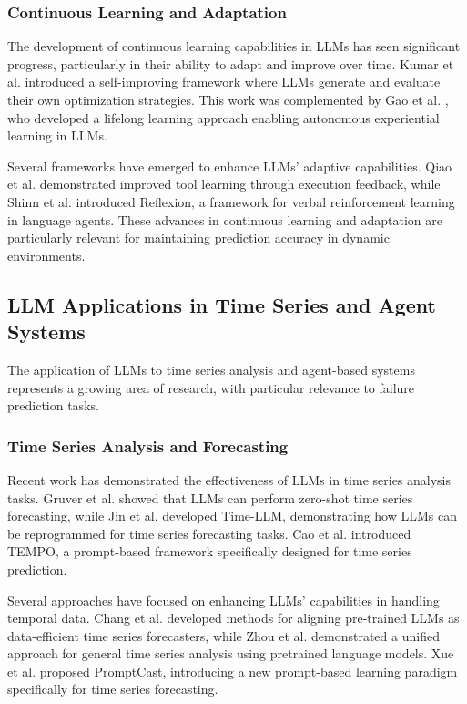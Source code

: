 \documentclass[conference]{IEEEtran}
\begin{document}
\subsubsection{Continuous Learning and Adaptation}
The development of continuous learning capabilities in LLMs has seen significant progress, particularly in their ability to adapt and improve over time. Kumar et al. \cite{kumar2023} introduced a self-improving framework where LLMs generate and evaluate their own optimization strategies. This work was complemented by Gao et al. \cite{gao2024}, who developed a lifelong learning approach enabling autonomous experiential learning in LLMs.

Several frameworks have emerged to enhance LLMs' adaptive capabilities. Qiao et al. \cite{qiao2024} demonstrated improved tool learning through execution feedback, while Shinn et al. \cite{shinn2023} introduced Reflexion, a framework for verbal reinforcement learning in language agents. These advances in continuous learning and adaptation are particularly relevant for maintaining prediction accuracy in dynamic environments.

\subsection{LLM Applications in Time Series and Agent Systems}
The application of LLMs to time series analysis and agent-based systems represents a growing area of research, with particular relevance to failure prediction tasks.

\subsubsection{Time Series Analysis and Forecasting}
Recent work has demonstrated the effectiveness of LLMs in time series analysis tasks. Gruver et al. \cite{gruver2023} showed that LLMs can perform zero-shot time series forecasting, while Jin et al. \cite{jin2024} developed Time-LLM, demonstrating how LLMs can be reprogrammed for time series forecasting tasks. Cao et al. \cite{cao2024} introduced TEMPO, a prompt-based framework specifically designed for time series prediction.

Several approaches have focused on enhancing LLMs' capabilities in handling temporal data. Chang et al. \cite{chang2024} developed methods for aligning pre-trained LLMs as data-efficient time series forecasters, while Zhou et al. \cite{zhou2023} demonstrated a unified approach for general time series analysis using pretrained language models. Xue et al. \cite{xue2023} proposed PromptCast, introducing a new prompt-based learning paradigm specifically for time series forecasting.
\end{document}
